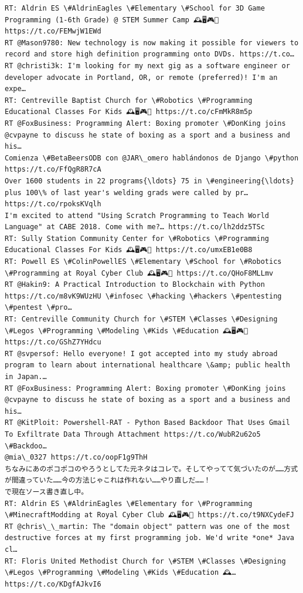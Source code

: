 \documentclass[11pt]{article}
\begin{document}
\begin{Verbatim}[commandchars=\\\{\}]
RT: Aldrin ES \#AldrinEagles \#Elementary \#School for 3D Game Programming (1-6th Grade) @ STEM Summer Camp 🕰️🖥️🎮💎 https://t.co/FEMwjW1EWd
RT @Mason9780: New technology is now making it possible for viewers to record and store high definition programming onto DVDs. https://t.co…
RT @christi3k: I'm looking for my next gig as a software engineer or developer advocate in Portland, OR, or remote (preferred)! I'm an expe…
RT: Centreville Baptist Church for \#Robotics \#Programming Educational Classes For Kids 🕰️🖥️🎮💎 https://t.co/cFmMkR8m5p
RT @FoxBusiness: Programming Alert: Boxing promoter \#DonKing joins @cvpayne to discuss he state of boxing as a sport and a business and his…
Comienza \#BetaBeersODB con @JAR\_omero hablándonos de Django \#python https://t.co/FfQgR8R7cA
Over 1600 students in 22 programs{\ldots} 75 in \#engineering{\ldots} plus 100\% of last year's welding grads were called by pr… https://t.co/rpoksKVqlh
I'm excited to attend "Using Scratch Programming to Teach World Language" at CABE 2018. Come with me?… https://t.co/lh2ddz5TSc
RT: Sully Station Community Center for \#Robotics \#Programming Educational Classes For Kids 🕰️🖥️🎮💎 https://t.co/umxEB1e0B8
RT: Powell ES \#ColinPowellES \#Elementary \#School for \#Robotics \#Programming at Royal Cyber Club 🕰️🖥️🎮💎 https://t.co/QHoF8MLLmv
RT @Hakin9: A Practical Introduction to Blockchain with Python https://t.co/m8vK9WUzHU \#infosec \#hacking \#hackers \#pentesting \#pentest \#pro…
RT: Centreville Community Church for \#STEM \#Classes \#Designing \#Legos \#Programming \#Modeling \#Kids \#Education 🕰️🖥️🎮💎 https://t.co/GShZ7YHdcu
RT @svpersof: Hello everyone! I got accepted into my study abroad program to learn about international healthcare \&amp; public health in Japan.…
RT @FoxBusiness: Programming Alert: Boxing promoter \#DonKing joins @cvpayne to discuss he state of boxing as a sport and a business and his…
RT @KitPloit: Powershell-RAT - Python Based Backdoor That Uses Gmail To Exfiltrate Data Through Attachment https://t.co/WubR2u62o5 \#Backdoo…
@mia\_0327 https://t.co/oopF1g9ThH
ちなみにあのポコポコのやろうとしてた元ネタはコレで。そしてやってて気づいたのが……方式が間違っていた……今の方法じゃこれは作れない……やり直しだ……！
で現在ソース書き直し中。
RT: Aldrin ES \#AldrinEagles \#Elementary for \#Programming \#MinecraftModding at Royal Cyber Club 🕰️🖥️🎮💎 https://t.co/t9NXCydeFJ
RT @chris\_\_martin: The "domain object" pattern was one of the most destructive forces at my first programming job. We'd write *one* Java cl…
RT: Floris United Methodist Church for \#STEM \#Classes \#Designing \#Legos \#Programming \#Modeling \#Kids \#Education 🕰️… https://t.co/KDgfAJkvI6

\end{Verbatim}
\end{document}
